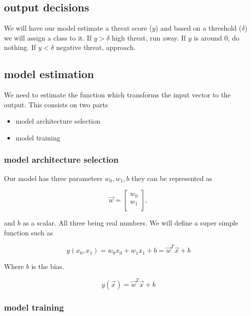 \documentclass[twocolumn]{article}
\begin{document}
\subsection{output decisions}

We will have our model estimate a threat score ($y$) and based on a threshold
($\delta$) we will assign a class to it. If $y > \delta$ high threat, run away.
If $y$ is around 0, do nothing. If $y < \delta$ negative threat,
approach.

\subsection{model estimation}

We need to estimate the function which transforms the input vector to the
output. This consists on two parts

\begin{itemize}
  \item model architecture selection
  \item model training
\end{itemize}

\subsubsection{model architecture selection}

Our model has three parameters $w_0, w_1, b$ they can be represented as

\begin{equation}
    \vec{w} = \begin{bmatrix}
                w_0 \\
                w_1 \\
              \end{bmatrix},
\end{equation}

and $b$ as a scalar. All three being real numbers. We will define a super
simple function such as

\noindent
\begin{equation}
    y(x_0, x_1) = w_0  x_0 + w_1  x_1 + b = \vec{w}^T\vec{x} + b
\end{equation}
\noindent

Where $b$ is the bias.

\begin{equation}
    y(\vec{x}) = \vec{w}^T\vec{x} + b
\end{equation}


\subsubsection{model training}
\end{document}
